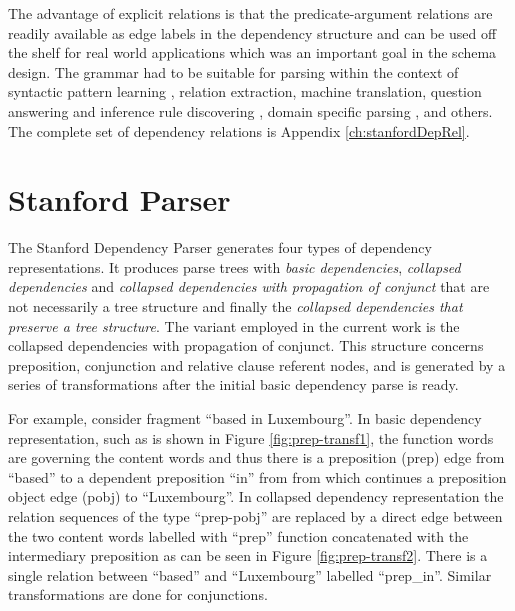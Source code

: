 The advantage of explicit relations is that the predicate-argument relations are readily available as edge labels in the dependency structure and can be used off the shelf for real world applications which was an important goal in the schema design. The grammar had to be suitable for parsing within the context of syntactic pattern learning \citep{snow2005learning}, relation extraction, machine translation, question answering and inference rule discovering \citep{lin2001discovery}, domain specific parsing \citep{clegg2007benchmarking}, and others. The complete set of dependency relations is Appendix \ref{ch:stanfordDepRel}.

\section{Stanford Parser}
\label{sec:collapsed-cc-output}
The Stanford Dependency Parser generates four types of dependency representations. It produces parse trees with \textit{basic dependencies}, \textit{collapsed dependencies} and \textit{collapsed dependencies with propagation of conjunct} that are not necessarily a tree structure and finally the \textit{collapsed dependencies that preserve a tree structure}. The variant employed in the current work is the collapsed dependencies with propagation of conjunct. This structure concerns preposition, conjunction and relative clause referent nodes, and is generated by a series of transformations after the initial basic dependency parse is ready.

For example, consider fragment ``based in Luxembourg''. In basic dependency representation, such as is shown in Figure \ref{fig:prep-transf1}, the function words are governing the content words and thus there is a preposition (prep) edge from ``based'' to a dependent preposition ``in'' from from which continues a preposition object edge (pobj) to ``Luxembourg''. In collapsed dependency representation the relation sequences of the type ``prep-pobj'' are replaced by a direct edge between the two content words labelled with ``prep'' function concatenated with the intermediary preposition as can be seen in Figure \ref{fig:prep-transf2}. There is a single relation between ``based'' and ``Luxembourg'' labelled ``prep\_in''. Similar transformations are done for conjunctions.

